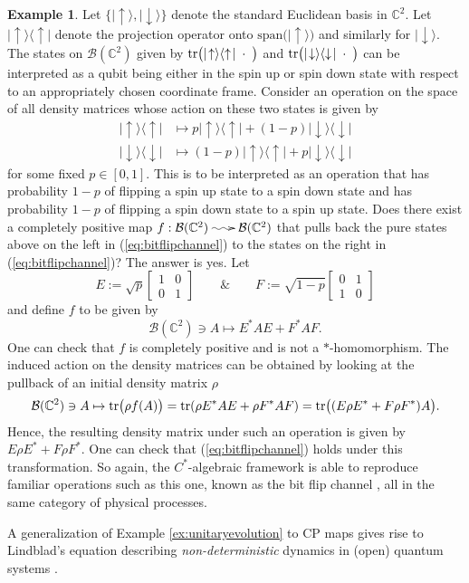 \documentclass[12pt]{article}
\makeatletter
\theoremstyle{theorem}
\theoremstyle{definition}
\newtheorem{example}[equation]{Example}
\numberwithin{equation}{section}
\let\C=\Chi \let\W=\Omega
\newcommand{\be}{\begin{equation}}
\newcommand{\ee}{\end{equation}}
\newcommand{\bx}{\begin{example}}
\newcommand{\ex}{\end{example}}
\newcommand{\<}{\langle}
\renewcommand{\>}{\rangle}
\newcommand{\up}{\uparrow}
\newcommand{\dn}{\downarrow}
\newcommand{\aand}{\qquad \& \qquad}
\newcommand{\tr}{{\rm tr} }
\def\C{{{\mathbb C}}}
\def\mB{{{\mathcal{B}}}}
\newcommand{\stoch}{\;\xy0;/r.25pc/:\ar@{~>}(3,0);(-3,0);\endxy\;}
\makeatother
\begin{document}
\bx
\label{ex:bitflipchannel}
Let $\big\{|\!\up\>,|\!\dn\>\big\}$ denote the standard Euclidean basis in $\C^2.$ 
Let $|\!\up\>\<\up\!|$ denote the projection operator onto 
$\mathrm{span}\big(|\!\up\>\big)$ and similarly for $|\!\dn\>.$ 
The states on $\mB(\C^2)$ given by $\tr\big(|\!\up\>\<\up\!|\;\cdot\;\big)$
and  $\tr\big(|\!\dn\>\<\dn\!|\;\cdot\;\big)$ can be interpreted as a qubit 
being either in the spin up or spin down state with respect to an 
appropriately chosen coordinate frame. Consider an operation on the 
space of all density matrices whose action on these two states is given by 
\be
\label{eq:bitflipchannel}
\begin{split}
|\!\up\>\<\up\!|&\mapsto p |\!\up\>\<\up\!|+(1-p)|\!\dn\>\<\dn\!|\\
|\!\dn\>\<\dn\!|&\mapsto (1-p)|\!\up\>\<\up\!|+p|\!\dn\>\<\dn\!|
\end{split}
\ee
for some fixed $p\in[0,1].$ This is to be interpreted as an operation that 
has probability $1-p$ of flipping a spin up state to a spin down state
and has probability $1-p$ of flipping a spin down state to a spin up state. 
Does there exist a completely positive map $f:\mB(\C^2)\stoch\mB(\C^2)$ 
that pulls back the pure states above on the left 
in (\ref{eq:bitflipchannel}) to the states on the right in (\ref{eq:bitflipchannel})? 
The answer is yes. Let 
\be
E:=\sqrt{p}\begin{bmatrix}1&0\\0&1\end{bmatrix}
\aand
F:=\sqrt{1-p}\begin{bmatrix}0&1\\1&0\end{bmatrix}
\ee
and define $f$ to be given by 
\be
\mB(\C^2)\ni A\mapsto E^{*}AE+F^{*}AF. 
\ee
One can check that $f$ is completely positive and is not a 
$*$-homomorphism. The induced action on the density matrices
can be obtained by looking at the pullback of an initial density matrix $\rho$ 
\be
\mB(\C^2)\ni A\mapsto\tr\big(\rho f(A)\big)=\tr(\rho E^{*}AE+\rho F^{*}AF)
=\tr\big((E\rho E^{*}+F\rho F^*)A\big).
\ee
Hence, the resulting density matrix under such an operation is given by
$E\rho E^{*}+F\rho F^*.$ One can check that 
(\ref{eq:bitflipchannel}) holds under this transformation. 
So again, the $C^*$-algebraic framework
is able to reproduce familiar operations such as this one, known as the 
bit flip channel \cite{NiCh10}, all in the same category of
physical processes. 
\ex

A generalization of Example \ref{ex:unitaryevolution}
to CP maps gives rise to Lindblad's equation describing
\emph{non-deterministic} dynamics in (open) quantum systems
\cite{Li76}. 
\end{document}
